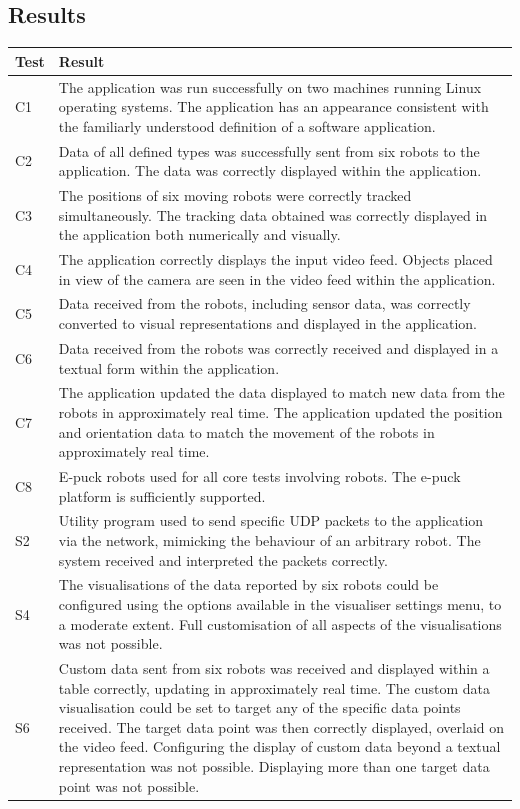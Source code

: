 \subsection{Results}
\begin{longtable}{ l p{10cm} }
 \textbf{Test} & \textbf{Result}\\
 \hline
 C1 & The application was run successfully on two machines running Linux operating systems. The application has an appearance consistent with the familiarly understood definition of a software application.\\\hline
 C2 & Data of all defined types was successfully sent from six robots to the application. The data was correctly displayed within the application.\\\hline
 C3 & The positions of six moving robots were correctly tracked simultaneously. The tracking data obtained was correctly displayed in the application both numerically and visually.\\\hline
 C4 & The application correctly displays the input video feed. Objects placed in view of the camera are seen in the video feed within the application.\\\hline
 C5 & Data received from the robots, including sensor data, was correctly converted to visual representations and displayed in the application.\\\hline
 C6 & Data received from the robots was correctly received and displayed in a textual form within the application.\\\hline
 C7 & The application updated the data displayed to match new data from the robots in approximately real time. The application updated the position and orientation data to match the movement of the robots in approximately real time.\\\hline
 C8 & E-puck robots used for all core tests involving robots. The e-puck platform is sufficiently supported.\\\hline
 \hline
 S2 & Utility program used to send specific UDP packets to the application via the network, mimicking the behaviour of an arbitrary robot. The system received and interpreted the packets correctly.\\\hline
 S4 & The visualisations of the data reported by six robots could be configured using the options available in the visualiser settings menu, to a moderate extent. Full customisation of all aspects of the visualisations was not possible.\\ \hline
 S6 & Custom data sent from six robots was received and displayed within a table correctly, updating in approximately real time. The custom data visualisation could be set to target any of the specific data points received. The target data point was then correctly displayed, overlaid on the video feed. Configuring the display of custom data beyond a textual representation was not possible. Displaying more than one target data point was not possible.\\\hline

\end{longtable}
